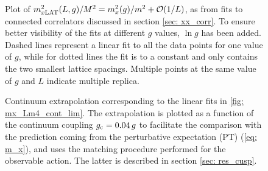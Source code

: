 %
%
%
\begin{figure}
\centering

\caption{Plot of $m_{x\rm LAT}^{2}(L,g)/M^{2}= m_{x}^{2}(g)/m^{2}+\mathcal{O}(1/L)$, as from fits to connected correlators discussed in section \ref{sec: xx_corr}. To ensure better visibility of the fits at different $g$ values, $\ln g$ has been added. Dashed lines represent a linear fit to all the data points for one value of $g$, while for dotted lines the fit is to a constant and only contains the two smallest lattice spacings. Multiple points at the same value of $g$ and $L$ indicate multiple replica.
\label{fig: mx_Lm4_cont_lim}}
\end{figure}
%
%
%
\begin{figure}
\centering

\caption{Continuum extrapolation corresponding to the linear fits in \autoref{fig: mx_Lm4_cont_lim}. The extrapolation is plotted as a function of the continuum coupling $g_{\rm c}=0.04\,g$ to facilitate the comparison with the prediction coming from the perturbative expectation (PT) (\ref{eq: m_x}), and uses the matching procedure performed for the observable action. The latter is described in section \ref{sec: res_cusp}.
\label{fig: mx_vs_g_Lm4}}
\end{figure}
%
%
%
%
